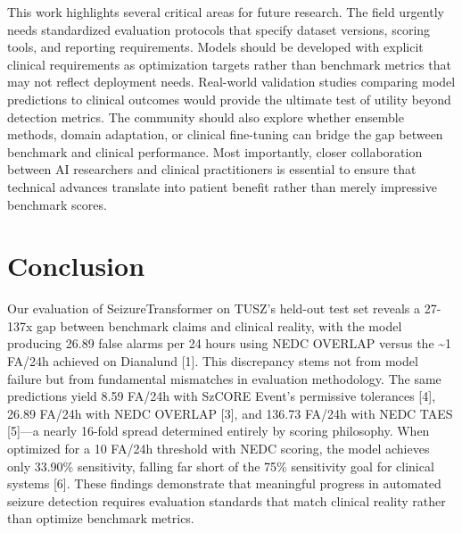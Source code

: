\documentclass[
]{article}
\begin{document}
This work highlights several critical areas for future research. The
field urgently needs standardized evaluation protocols that specify
dataset versions, scoring tools, and reporting requirements. Models
should be developed with explicit clinical requirements as optimization
targets rather than benchmark metrics that may not reflect deployment
needs. Real-world validation studies comparing model predictions to
clinical outcomes would provide the ultimate test of utility beyond
detection metrics. The community should also explore whether ensemble
methods, domain adaptation, or clinical fine-tuning can bridge the gap
between benchmark and clinical performance. Most importantly, closer
collaboration between AI researchers and clinical practitioners is
essential to ensure that technical advances translate into patient
benefit rather than merely impressive benchmark scores.

\hypertarget{conclusion}{%
\section{Conclusion}\label{conclusion}}

Our evaluation of SeizureTransformer on TUSZ's held-out test set reveals
a 27-137x gap between benchmark claims and clinical reality, with the
model producing 26.89 false alarms per 24 hours using NEDC OVERLAP
versus the \textasciitilde1 FA/24h achieved on Dianalund {[}1{]}. This
discrepancy stems not from model failure but from fundamental mismatches
in evaluation methodology. The same predictions yield 8.59 FA/24h with
SzCORE Event's permissive tolerances {[}4{]}, 26.89 FA/24h with NEDC
OVERLAP {[}3{]}, and 136.73 FA/24h with NEDC TAES {[}5{]}---a nearly
16-fold spread determined entirely by scoring philosophy. When optimized
for a 10 FA/24h threshold with NEDC scoring, the model achieves only
33.90\% sensitivity, falling far short of the 75\% sensitivity goal for
clinical systems {[}6{]}. These findings demonstrate that meaningful
progress in automated seizure detection requires evaluation standards
that match clinical reality rather than optimize benchmark metrics.
\end{document}
